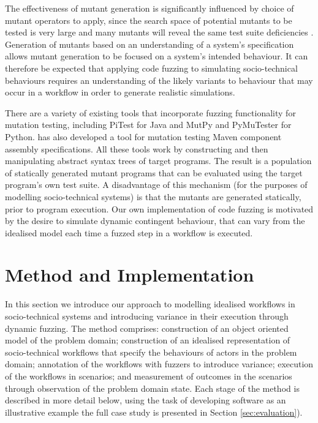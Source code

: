 \documentclass{sig-alternate}
\begin{document}
The effectiveness of mutant generation is significantly influenced by choice of mutant operators to apply, since the
search space of potential mutants to be tested is very large and many mutants will reveal the same test suite
deficiencies \citep{takanen08fuzzing}.  Generation of mutants based on an understanding of a system's specification
allows mutant generation to be focused on a system's intended behaviour.  It can therefore be expected that applying
code fuzzing to simulating socio-technical behaviours requires an understanding of the likely variants to behaviour that
may occur in a workflow in order to generate realistic simulations.

There are a variety of existing tools that incorporate fuzzing functionality for mutation testing, including PiTest
\citep{coles14pitest} for Java and MutPy \citep{mutpy26} and PyMuTester \citep{pymuttester} for Python.
\citet{storer15ringneck-repos} has also developed a tool for mutation testing Maven component assembly
specifications. All these tools work by constructing and then manipulating abstract syntax trees of target programs.
The result is a population of statically generated mutant programs that can be evaluated using the target program's own
test suite.  A disadvantage of this mechanism (for the purposes of modelling socio-technical systems) is that the
mutants are generated statically, prior to program execution.  Our own implementation of code fuzzing is motivated by
the desire to simulate dynamic contingent behaviour, that can vary from the idealised model each time a fuzzed step in a
workflow is executed.



\section{Method and Implementation}
\label{sec:fuzzi-moss}


In this section we introduce our approach to modelling idealised workflows in socio-technical systems and introducing
variance in their execution through dynamic fuzzing. The method comprises: construction of an object oriented model of
the problem domain; construction of an idealised representation of socio-technical workflows that specify the behaviours
of actors in the problem domain; annotation of the workflows with fuzzers to introduce variance; execution of the
workflows in scenarios; and measurement of outcomes in the scenarios through observation of the problem domain
state. Each stage of the method is described in more detail below, using the task of developing software as an
illustrative example the full case study is presented in Section \ref{sec:evaluation}).
\end{document}
